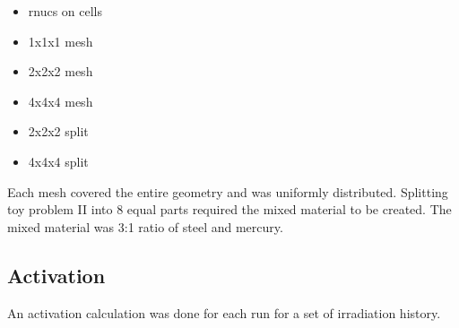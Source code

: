 \begin{itemize}
  \item rnucs on cells 
  \item 1x1x1 mesh
  \item 2x2x2 mesh
  \item 4x4x4 mesh 
  \item 2x2x2 split
  \item 4x4x4 split
\end{itemize}

Each mesh covered the entire geometry and was uniformly distributed. 
Splitting toy problem II into 8 equal parts required the mixed material to be created. 
The mixed material was 3:1 ratio of steel and mercury. 

\subsection{Activation}

An activation calculation was done for each run for a set of irradiation history. 





